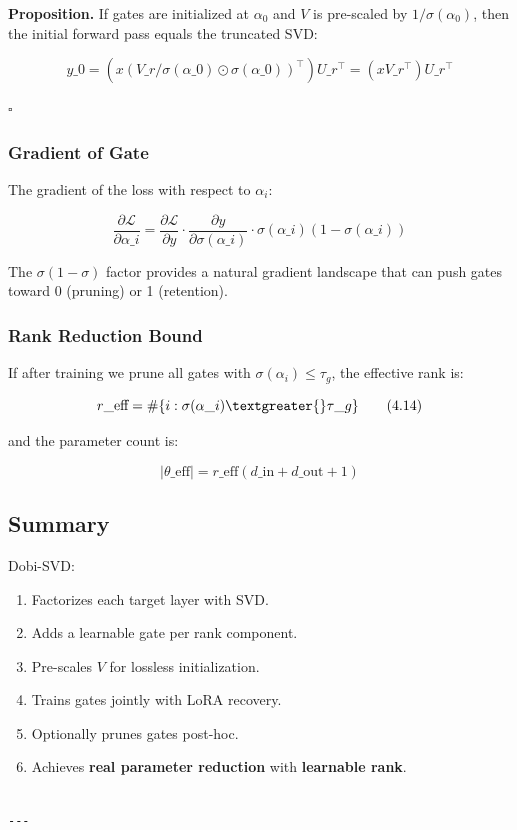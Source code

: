\textbf{Proposition.} If gates are initialized at $\alpha_0$ and $V$ is 
pre-scaled by $1/\sigma(\alpha_0)$, then the initial forward pass equals 
the truncated SVD:

\[
y\_0 = (x (V\_r / \sigma(\alpha\_0) \odot \sigma(\alpha\_0))^\top) U\_r^\top = (x V\_r^\top) U\_r^\top
\tag{4.12}
\]

$\square$

\subsubsection{Gradient of Gate}

The gradient of the loss with respect to $\alpha_i$:

\[
\frac{\partial \mathcal{L}}{\partial \alpha\_i}
= \frac{\partial \mathcal{L}}{\partial y} \cdot \frac{\partial y}{\partial \sigma(\alpha\_i)} \cdot \sigma(\alpha\_i)(1 - \sigma(\alpha\_i))
\tag{4.13}
\]

The $\sigma(1-\sigma)$ factor provides a natural gradient landscape 
that can push gates toward 0 (pruning) or 1 (retention).

\subsubsection{Rank Reduction Bound}

If after training we prune all gates with $\sigma(\alpha_i) \leq \tau_g$, the 
effective rank is:

\[
r\_\text{eff} = \#\{i : \sigma(\alpha\_i) \textgreater{} \tau\_g\}
\tag{4.14}
\]

and the parameter count is:

\[
|\theta\_\text{eff}| = r\_\text{eff}(d\_\text{in} + d\_\text{out} + 1)
\tag{4.15}
\]

\subsection{Summary}

Dobi-SVD:
\begin{enumerate}
\item Factorizes each target layer with SVD.
\item Adds a learnable gate per rank component.
\item Pre-scales $V$ for lossless initialization.
\item Trains gates jointly with LoRA recovery.
\item Optionally prunes gates post-hoc.
\item Achieves \textbf{real parameter reduction} with \textbf{learnable rank}.
\end{enumerate}
\begin{lstlisting}

---
\end{lstlisting}